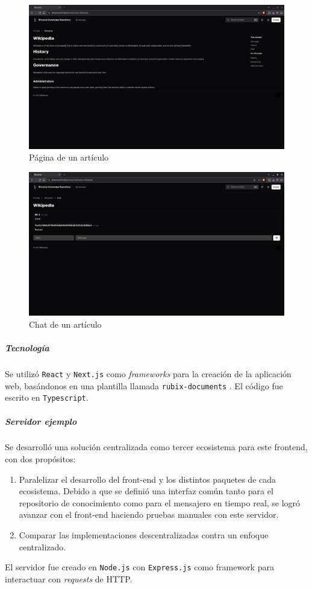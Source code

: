 \begin{figure}[H]
    \centering
    \includegraphics[width=1\linewidth]{img/frontends/article-page.png}
    \caption{Página de un artículo}
    \label{fig:astraweb-article-page}
\end{figure}

\begin{figure}[H]
    \centering
    \includegraphics[width=1\linewidth]{img/frontends/astraweb-chat.png}
    \caption{Chat de un artículo}
    \label{fig:astraweb-chat}
\end{figure}

\subparagraph{Tecnología} Se utilizó \texttt{React} \cite{react} y \texttt{Next.js} \cite{next} como \textit{frameworks} para la creación de la aplicación web, basándonos en una plantilla llamada \texttt{rubix-documents} \cite{rubix}. El código fue escrito en \texttt{Typescript}.

\subparagraph{Servidor ejemplo} Se desarrolló una solución centralizada como tercer ecosistema para este frontend, con dos propósitos:
\begin{enumerate}
    \item Paralelizar el desarrollo del front-end y los distintos paquetes de cada ecosistema. Debido a que se definió una interfaz común tanto para el repositorio de conocimiento como para el mensajero en tiempo real, se logró avanzar con el front-end haciendo pruebas manuales con este servidor.
    \item Comparar las implementaciones descentralizadas contra un enfoque centralizado.
\end{enumerate}
El servidor fue creado en \texttt{Node.js} con \texttt{Express.js} como framework para interactuar con \textit{requests} de HTTP.


